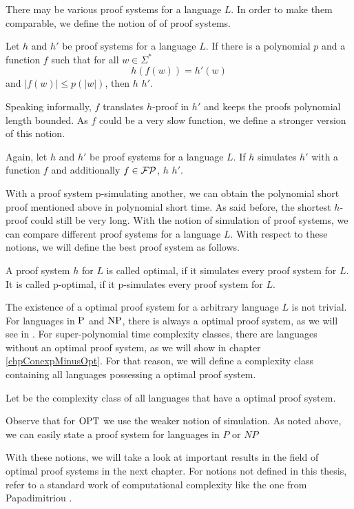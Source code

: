   There may be various proof systems for a language \(L\). In order to make them comparable, we define the notion of  of proof systems.
  
  \begin{definition}
    Let \(h\) and \(h'\) be proof systems for a language \(L\). If there is a polynomial \(p\) and a function \(f\) such that for all \(w \in \Sigma^*\)
      \[
        h(f(w)) = h'(w)
      \]
    and \(|f(w)| \leq p(|w|)\), then \(h\)  \(h'\).
  \end{definition}

  Speaking informally, \(f\) translates \(h\)-proof in \(h'\) and keeps the proofs polynomial length bounded. As \(f\) could be a very slow function, we define a stronger version of this notion.

  \begin{definition}
   Again, let \(h\) and \(h'\) be proof systems for a language \(L\). If \(h\) simulates \(h'\) with a function \(f\) and additionally \(f \in \FP\), \(h\)  \(h'\).
  \end{definition}

  With a proof system p-simulating another, we can obtain the polynomial short proof mentioned above in polynomial short time. As said before, the shortest \(h\)-proof could still be very long. With the notion of simulation of proof systems, we can compare different proof systems for a language \(L\). With respect to these notions, we will define the best proof system as follows.

  \begin{definition}
    A proof system \(h\) for \(L\) is called optimal, if it simulates every proof system for \(L\). It is called p-optimal, if it p-simulates every proof system for \(L\).
  \end{definition}

  The existence of a optimal proof system for a arbitrary language \(L\) is not trivial. For languages in \(\P\) and \(\NP\), there is always a optimal proof system, as we will see in . For super-polynomial time complexity classes, there are languages without an optimal proof system, as we will show in chapter \ref{chpConexpMinusOpt}. For that reason, we will define a complexity class containing all languages possessing a optimal proof system.

  \begin{definition}
    Let  be the complexity class of all languages that have a optimal proof system.
  \end{definition}

  Observe that for \(\OPT\) we use the weaker notion of simulation. As noted above, we can easily state a proof system for languages in \(P\) or \(NP\)

  With these notions, we will take a look at important results in the field of optimal proof systems in the next chapter. For notions not defined in this thesis, refer to a standard work of computational complexity like the one from Papadimitriou \cite{Pap94}.

